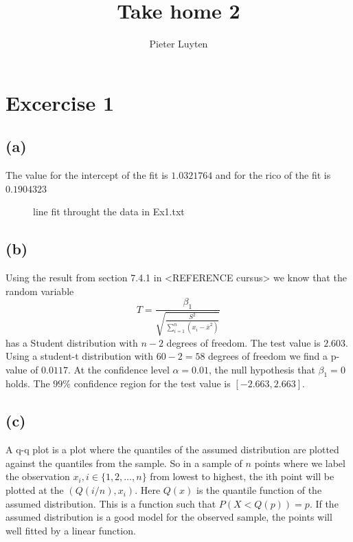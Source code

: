 \documentclass[a4paper]{article}
\title{Take home 2}
\author{Pieter Luyten}
\begin{document}
\maketitle

\section*{Excercise 1}
\subsection*{(a)}
\noindent {}

The value for the intercept of the fit is $1.0321764$ and for the rico of the fit is $0.1904323$
\begin{figure}[h]
	\centering
	
	\caption{line fit throught the data in Ex1.txt}
	\label{fig:fit-1a}
\end{figure}

\subsection*{(b)}
\noindent {}

Using the result from section 7.4.1 in <REFERENCE cursus> we know that the random variable
\begin{equation}
	T = \frac{\beta_1}{\sqrt{ \frac{S^2}{ \sum_{i=1}^{n}(x_i-\bar{x}^2)}}}
\end{equation}
has a Student distribution with $n-2$ degrees of freedom. The test value is $2.603$. Using a student-t distribution with $60-2=58$ degrees of freedom we find a p-value of $0.0117$. At the confidence level $\alpha=0.01$, the null hypothesis that $\beta_1=0$ holds. The $99\%$ confidence region for the test value is $[-2.663, 2.663]$.

\subsection*{(c)}
\noindent {}

A q-q plot is a plot where the quantiles of the assumed distribution are plotted against the quantiles from the sample. So in a sample of $n$ points where we label the observation $x_i, i \in \{1,2, \ldots, n\}$ from lowest to highest, the ith point will be plotted at the $(Q(i/n), x_i)$. 
Here $Q(x)$ is the quantile function of the assumed distribution. This is a function such that $ P( X < Q(p)) = p$. If the assumed distribution is a good model for the observed sample, the points will well fitted by a linear function.
\end{document}
